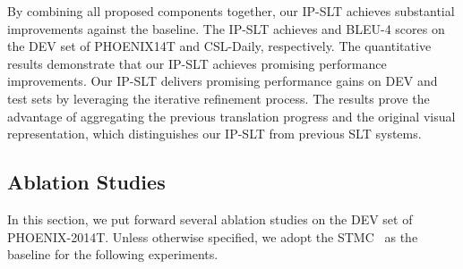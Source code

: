 \documentclass[10pt,twocolumn,letterpaper]{article}
\begin{document}
    By combining all proposed components together, our IP-SLT achieves substantial improvements against the baseline. 
    The IP-SLT achieves  and  BLEU-4 scores on the DEV set of PHOENIX14T and CSL-Daily, respectively. 
    The quantitative results demonstrate that our IP-SLT achieves promising performance improvements.
    Our IP-SLT delivers promising performance gains on DEV and test sets by leveraging the iterative refinement process. The results prove the advantage of aggregating the previous translation progress and the original visual representation, which distinguishes our IP-SLT from previous SLT systems.
    
    
    
    \subsection{Ablation Studies}
    In this section, we put forward several ablation studies on the DEV set of PHOENIX-2014T. Unless otherwise specified, we adopt the STMC~\cite{zhou2021spatial} as the baseline for the following experiments.

    \setlength{\tabcolsep}{2.4pt}
    \begin{table}[!t]
     \scriptsize
     \vspace{0.5mm}
     \caption{Effect of our proposed components. `Refinement' denotes applying the refinement process. `IDL' denotes applying the iterative distillation loss. 
     `- layers' denotes enlarging the encoder and decoder of the baseline system from  to  layers.
     }
     \label{tab:A1}
     \vspace{-1mm}
     \end{table}
\end{document}
